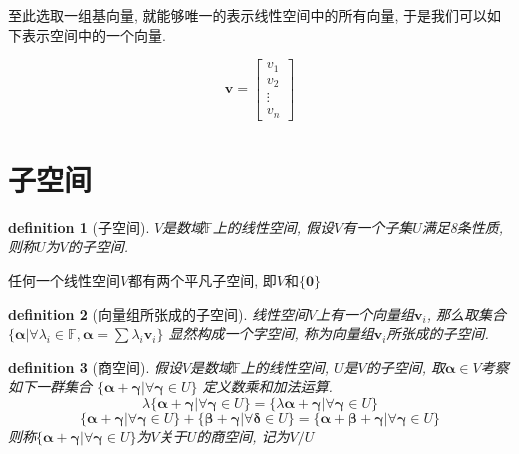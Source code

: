 \documentclass[12pt]{ctexbook}
\newtheorem{definition}{definition}
\numberwithin{definition}{section}
\numberwithin{theorem}{section}
\numberwithin{exercise}{section}
\numberwithin{example}{section}
\numberwithin{lemma}{section}
\begin{document}
    至此选取一组基向量, 就能够唯一的表示线性空间中的所有向量, 于是我们可以如下表示空间中的一个向量.

    \begin{equation}
        \boldsymbol{v} = \begin{bmatrix}
            v_1 \\
            v_2 \\
            \vdots \\
            v_n
        \end{bmatrix}
    \end{equation}

    \section{子空间}

    \begin{definition}
        [子空间] \(V\)是数域\(\mathbb{F}\)上的线性空间, 假设\(V\)有一个子集\(U\)满足8条性质, 则称\(U\)为\(V\)的子空间.
    \end{definition}

    任何一个线性空间\(V\)都有两个平凡子空间, 即\(V\)和\(\{\boldsymbol{0}\}\)

    \begin{definition}
        [向量组所张成的子空间] 线性空间\(V\)上有一个向量组\(\boldsymbol{v}_i\), 
        那么取集合\(\{\boldsymbol{\alpha} | \forall \lambda_i \in \mathbb{F}, \boldsymbol{\alpha} = \sum \lambda_i \boldsymbol{v}_i\}\)
        显然构成一个字空间, 称为向量组\(\boldsymbol{v}_i\)所张成的子空间.
    \end{definition}

    \begin{definition}
        [商空间] 假设\(V\)是数域\(\mathbb{F}\)上的线性空间, \(U\)是\(V\)的子空间, 取\(\boldsymbol{\alpha} \in V\)考察如下一群集合
        \(\{\boldsymbol{\alpha} + \boldsymbol{\gamma} | \forall \boldsymbol{\gamma} \in U\}\)
        定义数乘和加法运算.
        \begin{equation}
            \lambda \{\boldsymbol{\alpha} + \boldsymbol{\gamma} | \forall \boldsymbol{\gamma} \in U\} = 
            \{\lambda \boldsymbol{\alpha} + \boldsymbol{\gamma} | \forall \boldsymbol{\gamma} \in U\}
        \end{equation}
        \begin{equation}
            \{\boldsymbol{\alpha} + \boldsymbol{\gamma} | \forall \boldsymbol{\gamma} \in U\} + \{\boldsymbol{\beta} + \boldsymbol{\gamma} | \forall \boldsymbol{\delta} \in U\} = 
            \{\boldsymbol{\alpha} + \boldsymbol{\beta} + \boldsymbol{\gamma} | \forall \boldsymbol{\gamma} \in U\}
        \end{equation}
        则称\(\{\boldsymbol{\alpha} + \boldsymbol{\gamma} | \forall \boldsymbol{\gamma} \in U\}\)为\(V\)关于\(U\)的商空间, 记为\(V/U\)
    \end{definition}
\end{document}
